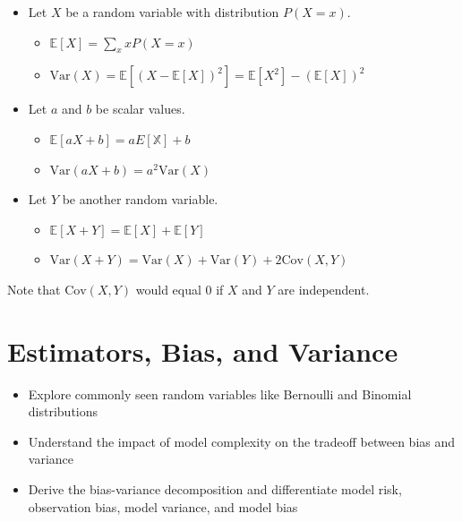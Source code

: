 \documentclass[
  letterpaper,
  DIV=11,
  numbers=noendperiod]{scrreprt}
\providecommand{\tightlist}{%
  \setlength{\itemsep}{0pt}\setlength{\parskip}{0pt}}\usepackage{longtable,booktabs,array}
\begin{document}
\begin{itemize}
\tightlist
\item
  Let \(X\) be a random variable with distribution \(P(X=x)\).

  \begin{itemize}
  \tightlist
  \item
    \(\mathbb{E}[X] = \sum_{x} x P(X=x)\)
  \item
    \(\text{Var}(X) = \mathbb{E}[(X-\mathbb{E}[X])^2] = \mathbb{E}[X^2] - (\mathbb{E}[X])^2\)
  \end{itemize}
\item
  Let \(a\) and \(b\) be scalar values.

  \begin{itemize}
  \tightlist
  \item
    \(\mathbb{E}[aX+b] = aE[\mathbb{X}] + b\)
  \item
    \(\text{Var}(aX+b) = a^2 \text{Var}(X)\)
  \end{itemize}
\item
  Let \(Y\) be another random variable.

  \begin{itemize}
  \tightlist
  \item
    \(\mathbb{E}[X+Y] = \mathbb{E}[X] + \mathbb{E}[Y]\)
  \item
    \(\text{Var}(X + Y) = \text{Var}(X) + \text{Var}(Y) + 2\text{Cov}(X,Y)\)
  \end{itemize}
\end{itemize}

Note that \(\text{Cov}(X,Y)\) would equal 0 if \(X\) and \(Y\) are
independent.


\chapter{Estimators, Bias, and
Variance}\label{estimators-bias-and-variance}

\begin{tcolorbox}[enhanced jigsaw, titlerule=0mm, bottomtitle=1mm, arc=.35mm, colframe=quarto-callout-note-color-frame, rightrule=.15mm, opacityback=0, opacitybacktitle=0.6, leftrule=.75mm, breakable, toprule=.15mm, colback=white, left=2mm, colbacktitle=quarto-callout-note-color!10!white, toptitle=1mm, bottomrule=.15mm, title=\textcolor{quarto-callout-note-color}{\faInfo}\hspace{0.5em}{Learning Outcomes}, coltitle=black]

\begin{itemize}
\tightlist
\item
  Explore commonly seen random variables like Bernoulli and Binomial
  distributions
\item
  Understand the impact of model complexity on the tradeoff between bias
  and variance
\item
  Derive the bias-variance decomposition and differentiate model risk,
  observation bias, model variance, and model bias
\end{itemize}

\end{tcolorbox}
\end{document}
